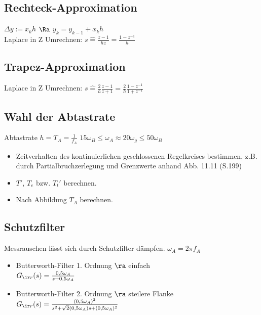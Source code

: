 \documentclass[german]{latex4ei/latex4ei_sheet}
\begin{document}
\begin{sectionbox}
	\subsection{Rechteck-Approximation}
	$\Delta y := x_k h$ \quad $\Ra$ \quad $y_k = y_{k-1} + x_k h$\\
	Laplace in Z Umrechnen: $s \hat = \frac{z-1}{hz} = \frac{1 - z^{-1}}{h}$

	\subsection{Trapez-Approximation}
	Laplace in Z Umrechnen: $s \hat = \frac{2}{h} \frac{z-1}{z+1} = \frac{2}{h} \frac{1- z^{-1}}{1+ z^{-1}}$

	\subsection{Wahl der Abtastrate}
	Abtastrate $h = T_A = \frac{1}{f_A}$ \qquad $15 \omega_B \le \omega_A \approx 20 \omega_g \le 50 \omega_B$\\
	\begin{itemize}
		\item Zeitverhalten des kontinuierlichen geschlossenen Regelkreises bestimmen, z.B. durch Partialbruchzerlegung und Grenzwerte anhand Abb. 11.11 (S.199)
		\item $T'$, $T_e$ bzw. $T_t'$ berechnen.
		\item Nach Abbildung $T_A$ berechnen.
	\end{itemize}
\end{sectionbox}

\begin{sectionbox}
	\subsection{Schutzfilter}
	Messrauschen lässt sich durch Schutzfilter dämpfen. $\omega_A = 2 \pi f_A$
	\begin{itemize}
		\item Butterworth-Filter 1. Ordnung $\ra$ einfach\\
			$G_{\ir r}(s) = \frac{0,5 \omega_A}{s + 0,5 \omega_A}$
		\item Butterworth-Filter 2. Ordnung $\ra$ steilere Flanke\\
			$G_{\ir r}(s) = \frac{(0,5 \omega_A)^2}{s^2 + \sqrt{2} (0,5 \omega_A) s + (0,5 \omega_A)^2}$
	\end{itemize}
\end{sectionbox}
\end{document}
